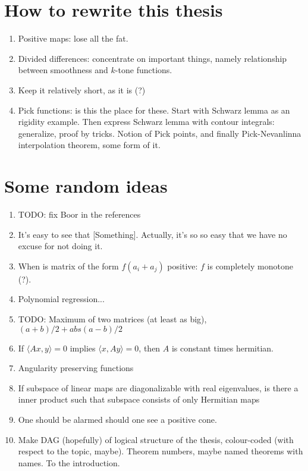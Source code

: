 \section{How to rewrite this thesis}

\begin{enumerate}
	\item Positive maps: lose all the fat.
	\item Divided differences: concentrate on important things, namely relationship between smoothness and $k$-tone functions.
	\item Keep it relatively short, as it is (?)
	\item Pick functions: is this the place for these. Start with Schwarz lemma as an rigidity example. Then express Schwarz lemma with contour integrals: generalize, proof by tricks. Notion of Pick points, and finally Pick-Nevanlinna interpolation theorem, some form of it.
\end{enumerate}

\section{Some random ideas}
\begin{enumerate}
	\item TODO: fix Boor in the references
	\item It's easy to see that [Something]. Actually, it's so so easy that we have no excuse for not doing it.
	\item When is matrix of the form $f(a_{i} + a_{j})$ positive: $f$ is completely monotone (?).
	\item Polynomial regression...
	\item TODO: Maximum of two matrices (at least as big), $(a + b)/2 + abs(a - b)/2$
	\item If $\langle A x, y \rangle = 0$ implies $\langle x, A y \rangle = 0$, then $A$ is constant times hermitian.
	\item Angularity preserving functions
	\item If subspace of linear maps are diagonalizable with real eigenvalues, is there a inner product such that subspace consists of only Hermitian maps
	\item One should be alarmed should one see a positive cone.
	\item Make DAG (hopefully) of logical structure of the thesis, colour-coded (with respect to the topic, maybe). Theorem numbers, maybe named theorems with names. To the introduction.
\end{enumerate}

